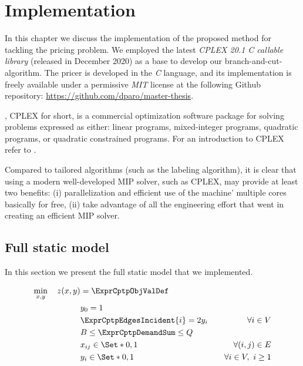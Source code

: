\chapter{Implementation}

In this chapter we discuss the implementation of the proposed method
for tackling the pricing problem.
We employed the latest \textit{CPLEX 20.1 C callable library} (released in December 2020)
as a base
to develop our branch-and-cut-algorithm.
The pricer is developed in the \textit{C} language, and its implementation
is freely available under a permissive \textit{MIT} license
at the following Github repository: \url{https://github.com/dparo/master-thesis}.

\medskip

,
CPLEX for short,
is a commercial optimization software package for solving problems expressed as either:
linear programs, mixed-integer programs, quadratic programs, or quadratic constrained programs.
For an introduction to CPLEX refer to .

\medskip

Compared to tailored algorithms (such as the labeling algorithm),
it is clear that using a modern well-developed MIP solver, such as CPLEX,
may provide at least two benefits: (i) parallelization and
efficient use of the machine' multiple cores basically for free,
(ii) take advantage of all the engineering effort that went in creating an efficient MIP solver.

\section{Full static model}

In this section we present the full static model that we implemented.

\begin{align}
	\min_{x,y} \quad z(x, y) & = \ExprCptpObjValDef                                                       \\
	                         & y_0 = 1                                  &                                 \\
	                         & \ExprCptpEdgesIncident{i}    = 2 y_i     & \quad \forall i \in V           \\
	                         & B \le   \ExprCptpDemandSum   \le Q       &                                 \\
	                         & x_{ij}                   \in \Set*{0, 1} & \quad \forall (i, j) \in E      \\
	                         & y_{i}                    \in \Set*{0, 1} & \quad \forall i \in V,\ i \ge 1
\end{align}

